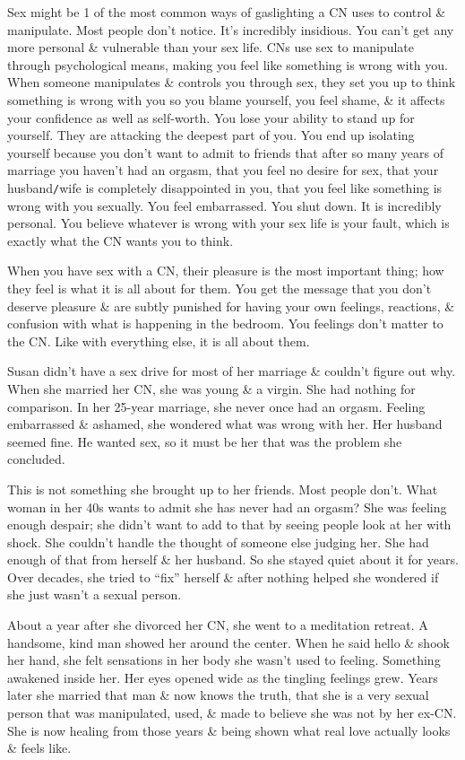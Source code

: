 \documentclass{article}
\numberwithin{equation}{section}
\begin{document}
Sex might be 1 of the most common ways of gaslighting a CN uses to control \& manipulate. Most people don't notice. It's incredibly insidious. You can't get any more personal \& vulnerable than your sex life. CNs use sex to manipulate through psychological means, making you feel like something is wrong with you. When someone manipulates \& controls you through sex, they set you up to think something is wrong with you so you blame yourself, you feel shame, \& it affects your confidence as well as self-worth. You lose your ability to stand up for yourself. They are attacking the deepest part of you. You end up isolating yourself because you don't want to admit to friends that after so many years of marriage you haven't had an orgasm, that you feel no desire for sex, that your husband\texttt{/}wife is completely disappointed in you, that you feel like something is wrong with you sexually. You feel embarrassed. You shut down. It is incredibly personal. You believe whatever is wrong with your sex life is your fault, which is exactly what the CN wants you to think.

When you have sex with a CN, their pleasure is the most important thing; how they feel is what it is all about for them. You get the message that you don't deserve pleasure \& are subtly punished for having your own feelings, reactions, \& confusion with what is happening in the bedroom. You feelings don't matter to the CN. Like with everything else, it is all about them.

Susan didn't have a sex drive for most of her marriage \& couldn't figure out why. When she married her CN, she was young \& a virgin. She had nothing for comparison. In her 25-year marriage, she never once had an orgasm. Feeling embarrassed \& ashamed, she wondered what was wrong with her. Her husband seemed fine. He wanted sex, so it must be her that was the problem she concluded.

This is not something she brought up to her friends. Most people don't. What woman in her 40s wants to admit she has never had an orgasm? She was feeling enough despair; she didn't want to add to that by seeing people look at her with shock. She couldn't handle the thought of someone else judging her. She had enough of that from herself \& her husband. So she stayed quiet about it for years. Over decades, she tried to ``fix'' herself \& after nothing helped she wondered if she just wasn't a sexual person.

About a year after she divorced her CN, she went to a meditation retreat. A handsome, kind man showed her around the center. When he said hello \& shook her hand, she felt sensations in her body she wasn't used to feeling. Something awakened inside her. Her eyes opened wide as the tingling feelings grew. Years later she married that man \& now knows the truth, that she is a very sexual person that was manipulated, used, \& made to believe she was not by her ex-CN. She is now healing from those years \& being shown what real love actually looks \& feels like.
\end{document}
